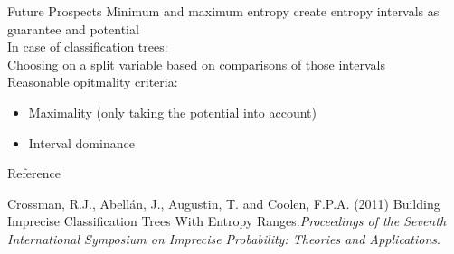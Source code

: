 \documentclass{beamer}
\theoremstyle{definition} \newtheorem{llemma}{Lemma}
\begin{document}
\begin{frame}{Future Prospects}
Minimum and maximum entropy create entropy intervals as guarantee and potential\\[0.6em]
In case of classification trees:\\
Choosing on a split variable based on comparisons of those intervals\\
Reasonable opitmality criteria:
\begin{itemize}
\item Maximality (only taking the potential into account)
\item Interval dominance
\end{itemize}
\end{frame}

\begin{frame}{Reference}
\begin{thebibliography}{99}
 Crossman, R.J., Abell\'{a}n, J., Augustin, T. and Coolen, F.P.A. (2011) Building Imprecise Classification Trees With Entropy Ranges.\emph{Proceedings of the Seventh International Symposium on Imprecise Probability: Theories and Applications}.\\
\end{thebibliography}
\end{frame}
\end{document}

